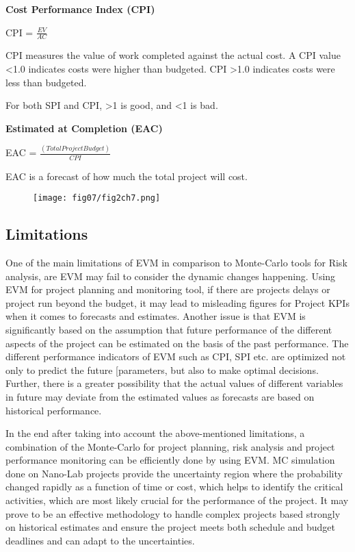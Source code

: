 \textbf{Cost Performance Index (CPI)} 

CPI =  $\frac{EV}{AC}$

CPI measures the value of work completed against the actual cost. A CPI value <1.0 indicates costs were higher than budgeted. CPI >1.0 indicates costs were less than budgeted.

For both SPI and CPI, >1 is good, and <1 is bad. 

\textbf{Estimated at Completion (EAC)} 

EAC = $\frac{(Total Project Budget)}{CPI}$

EAC is a forecast of how much the total project will cost.

\begin{figure}
	\centering
	\texttt{[image: fig07/fig2ch7.png]}
	\label{img15ch7}
\end{figure}


\subsection {Limitations} 

One of the main limitations of EVM in comparison to Monte-Carlo tools for Risk analysis, are EVM may fail to consider the dynamic changes happening.
Using EVM for project planning and monitoring tool, if there are projects delays or project run beyond the budget, it may lead to misleading figures for Project KPIs when it comes to forecasts and estimates. Another issue is that EVM is significantly based on the assumption that future performance of the different aspects of the project can be estimated on the basis of the past performance. The different performance indicators of EVM such as CPI, SPI etc. are optimized not only to predict the future [parameters, but also to make optimal decisions. Further, there is a greater possibility that the actual values of different variables in future may deviate from the estimated values as forecasts are based on historical performance.


In the end after taking into account the above-mentioned limitations, a combination of the Monte-Carlo for project planning, risk analysis and project performance monitoring can be efficiently done by using EVM. MC simulation done on Nano-Lab projects provide the uncertainty region where the probability changed rapidly as a function of time or cost, which helps to identify the critical activities, which are most likely crucial for the performance of the project. It may prove to be an effective methodology to handle complex projects based strongly on historical estimates and ensure the project meets both schedule and budget deadlines and can adapt to the uncertainties.


